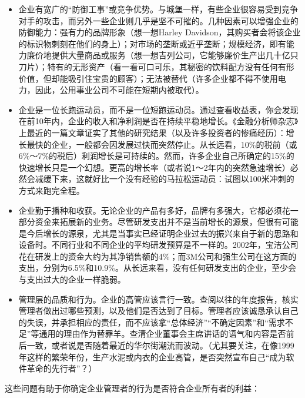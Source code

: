 \documentclass[12pt,oneside]{book}
\begin{document}
\begin{itemize}
\item 企业有宽广的“防御工事”或竞争优势。与城堡一样，有些企业很容易受到竞争对手的攻击，而另外一些企业则几乎是坚不可摧的。几种因素可以增强企业的防御能力：强有力的品牌形象（想一想Harley Davidson，其购买者会将该企业的标识物刺刻在他们的身上）；对市场的垄断或近乎垄断；规模经济，即有能力廉价地提供大量商品或服务（想一想吉列公司，它能够廉价生产出几十亿只刀片）；特有的无形资产（看一看可口可乐，其秘密的饮料配方没有任何有形价值，但却能吸引住宝贵的顾客）；无法被替代（许多企业都不得不使用电力，因此，公用事业公司不可能在短期内被取代）。
\item 企业是一位长跑运动员，而不是一位短跑运动员。通过查看收益表，你会发现在前10年内，企业的收入和净利润是否在持续平稳地增长。《金融分析师杂志》上最近的一篇文章证实了其他的研究结果（以及许多投资者的惨痛经历）：增长最快的企业，一般都会因发展过快而突然停止。从长远看，10\%的税前（或6\%～7\%的税后）利润增长是可持续的。然而，许多企业自己所确定的15\%的快速增长只是一个幻想。更高的增长率（或者说1～2年内的突然急速增长）必然会减缓下来，这就好比一个没有经验的马拉松运动员：试图以100米冲刺的方式来跑完全程。
\item 企业勤于播种和收获。无论企业的产品有多好，品牌有多强大，它都必须花一部分资金来拓展新的业务。尽管研发支出并不是当前增长的源泉，但很有可能是今后增长的源泉，尤其是当事实已经证明企业过去的振兴来自于新的思路和设备时。不同行业和不同企业的平均研发预算是不一样的。2002年，宝洁公司花在研发上的资金大约为其净销售额的4\%；而3M公司和强生公司在这方面的支出，分别为6.5\%和10.9\%。从长远来看，没有任何研发支出的企业，至少会与支出过大的企业一样脆弱。
\item 管理层的品质和行为。企业的高管应该言行一致。查阅以往的年度报告，核实管理者做出过哪些预测，以及他们是否达到了目标。管理者应该诚恳承认自己的失误，并承担相应的责任，而不应该拿“总体经济”“不确定因素”和“需求不足”等通用的理由作为替罪羊。查清企业董事会主席讲话的语气和内容是否前后一致，或者说是否随着最近的华尔街潮流而波动。（尤其要关注，在像1999年这样的繁荣年份，生产水泥或内衣的企业高管，是否突然宣布自己“成为软件革命的先行者”？）
\end{itemize}


这些问题有助于你确定企业管理者的行为是否符合企业所有者的利益：
\end{document}
